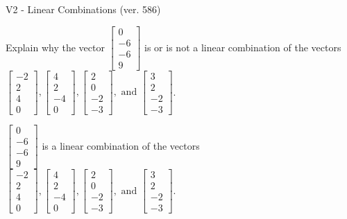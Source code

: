\begin{exercise}
  \begin{exerciseTitle}V2 - Linear Combinations (ver. 586)\end{exerciseTitle}
  \begin{exerciseStatement}
    Explain why the vector \(\left[\begin{array}{c}
0 \\
-6 \\
-6 \\
9
\end{array}\right]\)  is or is not a linear 
	combination of the vectors \(\left[\begin{array}{c}
-2 \\
2 \\
4 \\
0
\end{array}\right] , \left[\begin{array}{c}
4 \\
2 \\
-4 \\
0
\end{array}\right] , \left[\begin{array}{c}
2 \\
0 \\
-2 \\
-3
\end{array}\right] , \text{ and } \left[\begin{array}{c}
3 \\
2 \\
-2 \\
-3
\end{array}\right]\).
	


  \end{exerciseStatement}
  \begin{exerciseAnswer}
   \(\left[\begin{array}{c}
0 \\
-6 \\
-6 \\
9
\end{array}\right]\) 
  	 is  
	a linear combination of the vectors \(\left[\begin{array}{c}
-2 \\
2 \\
4 \\
0
\end{array}\right] , \left[\begin{array}{c}
4 \\
2 \\
-4 \\
0
\end{array}\right] , \left[\begin{array}{c}
2 \\
0 \\
-2 \\
-3
\end{array}\right] , \text{ and } \left[\begin{array}{c}
3 \\
2 \\
-2 \\
-3
\end{array}\right]\).


\end{exerciseAnswer}
\end{exercise}

